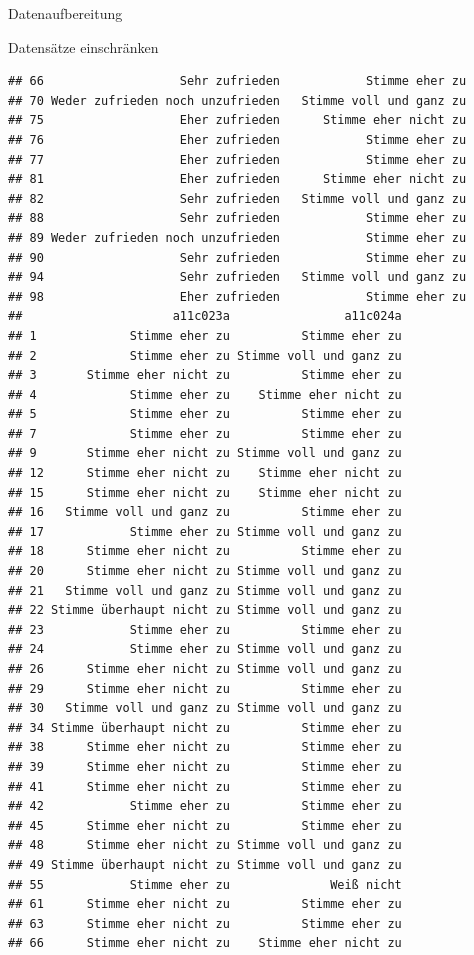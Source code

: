 \documentclass[ignorenonframetext,]{beamer}
\begin{document}
\begin{frame}[fragile]{Datenaufbereitung}
\begin{block}{Datensätze einschränken}
\begin{verbatim}
## 66                   Sehr zufrieden            Stimme eher zu
## 70 Weder zufrieden noch unzufrieden   Stimme voll und ganz zu
## 75                   Eher zufrieden      Stimme eher nicht zu
## 76                   Eher zufrieden            Stimme eher zu
## 77                   Eher zufrieden            Stimme eher zu
## 81                   Eher zufrieden      Stimme eher nicht zu
## 82                   Sehr zufrieden   Stimme voll und ganz zu
## 88                   Sehr zufrieden            Stimme eher zu
## 89 Weder zufrieden noch unzufrieden            Stimme eher zu
## 90                   Sehr zufrieden            Stimme eher zu
## 94                   Sehr zufrieden   Stimme voll und ganz zu
## 98                   Eher zufrieden            Stimme eher zu
##                     a11c023a                a11c024a
## 1             Stimme eher zu          Stimme eher zu
## 2             Stimme eher zu Stimme voll und ganz zu
## 3       Stimme eher nicht zu          Stimme eher zu
## 4             Stimme eher zu    Stimme eher nicht zu
## 5             Stimme eher zu          Stimme eher zu
## 7             Stimme eher zu          Stimme eher zu
## 9       Stimme eher nicht zu Stimme voll und ganz zu
## 12      Stimme eher nicht zu    Stimme eher nicht zu
## 15      Stimme eher nicht zu    Stimme eher nicht zu
## 16   Stimme voll und ganz zu          Stimme eher zu
## 17            Stimme eher zu Stimme voll und ganz zu
## 18      Stimme eher nicht zu          Stimme eher zu
## 20      Stimme eher nicht zu Stimme voll und ganz zu
## 21   Stimme voll und ganz zu Stimme voll und ganz zu
## 22 Stimme überhaupt nicht zu Stimme voll und ganz zu
## 23            Stimme eher zu          Stimme eher zu
## 24            Stimme eher zu Stimme voll und ganz zu
## 26      Stimme eher nicht zu Stimme voll und ganz zu
## 29      Stimme eher nicht zu          Stimme eher zu
## 30   Stimme voll und ganz zu Stimme voll und ganz zu
## 34 Stimme überhaupt nicht zu          Stimme eher zu
## 38      Stimme eher nicht zu          Stimme eher zu
## 39      Stimme eher nicht zu          Stimme eher zu
## 41      Stimme eher nicht zu          Stimme eher zu
## 42            Stimme eher zu          Stimme eher zu
## 45      Stimme eher nicht zu          Stimme eher zu
## 48      Stimme eher nicht zu Stimme voll und ganz zu
## 49 Stimme überhaupt nicht zu Stimme voll und ganz zu
## 55            Stimme eher zu              Weiß nicht
## 61      Stimme eher nicht zu          Stimme eher zu
## 63      Stimme eher nicht zu          Stimme eher zu
## 66      Stimme eher nicht zu    Stimme eher nicht zu

\end{verbatim}
\end{block}
\end{frame}
\end{document}
